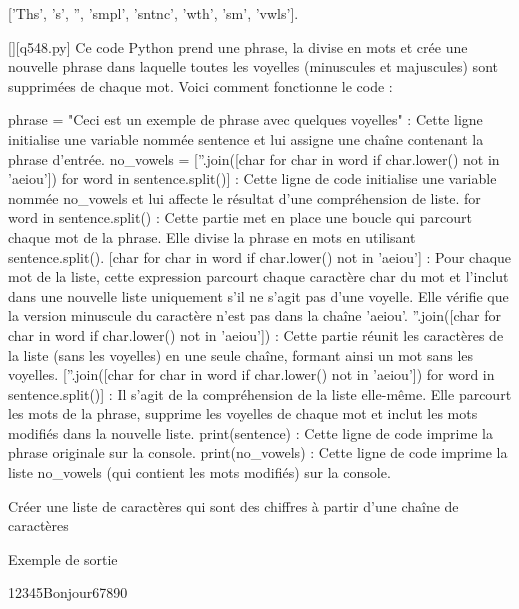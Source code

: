 ['Ths', 's', '', 'smpl', 'sntnc', 'wth', 'sm', 'vwls'].
        \par
        \begin{solution}
            \renewcommand{\nomfichier}{q548.py}
            \pythonfile{\chemincode \nomfichier}[][\nomfichier]
            Ce code Python prend une phrase, la divise en mots et crée une nouvelle phrase dans laquelle toutes les voyelles (minuscules et majuscules) sont supprimées de chaque mot. Voici comment fonctionne le code :

    phrase = "Ceci est un exemple de phrase avec quelques voyelles" : Cette ligne initialise une variable nommée sentence et lui assigne une chaîne contenant la phrase d'entrée.
    no_vowels = [''.join([char for char in word if char.lower() not in 'aeiou']) for word in sentence.split()] : Cette ligne de code initialise une variable nommée no_vowels et lui affecte le résultat d'une compréhension de liste.
        for word in sentence.split() : Cette partie met en place une boucle qui parcourt chaque mot de la phrase. Elle divise la phrase en mots en utilisant sentence.split().
        [char for char in word if char.lower() not in 'aeiou'] : Pour chaque mot de la liste, cette expression parcourt chaque caractère char du mot et l'inclut dans une nouvelle liste uniquement s'il ne s'agit pas d'une voyelle. Elle vérifie que la version minuscule du caractère n'est pas dans la chaîne 'aeiou'.
        ''.join([char for char in word if char.lower() not in 'aeiou']) : Cette partie réunit les caractères de la liste (sans les voyelles) en une seule chaîne, formant ainsi un mot sans les voyelles.
        [''.join([char for char in word if char.lower() not in 'aeiou']) for word in sentence.split()] : Il s'agit de la compréhension de la liste elle-même. Elle parcourt les mots de la phrase, supprime les voyelles de chaque mot et inclut les mots modifiés dans la nouvelle liste.
    print(sentence) : Cette ligne de code imprime la phrase originale sur la console.
    print(no_vowels) : Cette ligne de code imprime la liste no_vowels (qui contient les mots modifiés) sur la console.
        \end{solution}
        

        \question
        Créer une liste de caractères qui sont des chiffres à partir d'une chaîne de caractères

Exemple de sortie

12345Bonjour67890

